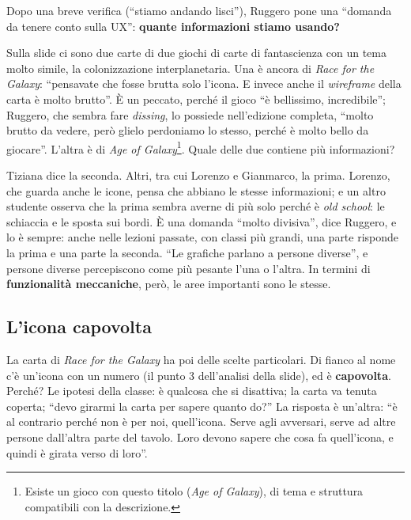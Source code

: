 

Dopo una breve verifica (``stiamo andando lisci''), Ruggero pone una ``domanda da
tenere conto sulla UX'': \textbf{quante informazioni stiamo usando?}

Sulla slide ci sono due carte di due giochi di carte di fantascienza con un tema molto
simile, la colonizzazione interplanetaria. Una è ancora di \emph{Race for the Galaxy}:
``pensavate che fosse brutta solo l'icona. E invece anche il \emph{wireframe} della
carta è molto brutto''. È un peccato, perché il gioco ``è bellissimo, incredibile'';
Ruggero, che sembra fare \emph{dissing}, lo possiede nell'edizione completa, ``molto
brutto da vedere, però glielo perdoniamo lo stesso, perché è molto bello da giocare''.
L'altra è di \emph{Age of Galaxy}\footnote{Esiste un
gioco con questo titolo (\emph{Age of Galaxy}), di tema e struttura compatibili
con la descrizione.}. Quale delle due contiene più informazioni?

Tiziana dice la seconda. Altri, tra cui Lorenzo e Gianmarco, la prima. Lorenzo, che
guarda anche le icone, pensa che abbiano le stesse informazioni; e un altro studente
osserva che la prima sembra averne di più solo perché è \emph{old school}: le schiaccia
e le sposta sui bordi. È una domanda ``molto divisiva'', dice Ruggero, e lo è sempre:
anche nelle lezioni passate, con classi più grandi, una parte risponde la prima e una
parte la seconda. ``Le grafiche parlano a persone diverse'', e persone diverse
percepiscono come più pesante l'una o l'altra. In termini di \textbf{funzionalità
meccaniche}, però, le aree importanti sono le stesse.

\subsection{L'icona capovolta}

La carta di \emph{Race for the Galaxy} ha poi delle scelte particolari. Di fianco al
nome c'è un'icona con un numero (il punto 3 dell'analisi della slide), ed è
\textbf{capovolta}. Perché? Le ipotesi della classe: è qualcosa che si disattiva; la
carta va tenuta coperta; ``devo girarmi la carta per sapere quanto do?'' La risposta è
un'altra: ``è al contrario perché non è per noi, quell'icona. Serve agli avversari,
serve ad altre persone dall'altra parte del tavolo. Loro devono sapere che cosa fa
quell'icona, e quindi è girata verso di loro''.

